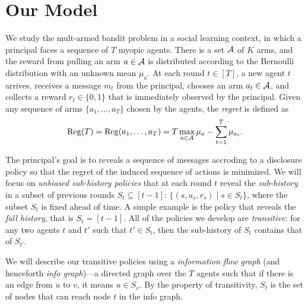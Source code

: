 \section{Our Model}
\label{sec:model}

We study the mult-armed bandit problem in a social learning context,
in which a principal faces a sequence of $T$ myopic agents. There is a
set $\mathcal{A}$ of $K$ arms, and the reward from pulling an arm $a\in \mathcal{A}$ is
distributed according to the Bernoulli distribution with an unknown
mean $\mu_a$.  At
each round $t\in [T]$, a new agent $t$ arrives, receives a message
$m_t$ from the principal, chooses an arm $a_t\in \mathcal{A}$, and collects a
reward $r_t\in \{0,1\}$ that is immediately observed by the
principal. Given any sequence of arms $\{a_1, \ldots, a_T\}$ chosen by
the agents, the \emph{regret} is defined as
\[
  \mathrm{Reg}(T)= \mathrm{Reg}(a_1, \ldots , a_T) = T \max_{a\in \mathcal{A}} \mu_a -
  \sum_{t=1}^T \mu_{a_t}.
\]





 The principal's goal is to reveals
a sequence of messages accroding to a disclosure policy so that the
regret of the induced sequence of actions is minimized. We will focus
on \emph{unbiased sub-history policies} that at each round $t$ reveal
the \emph{sub-history} in a subset of previous rounds
$S_t\subseteq [t-1]$: $\{(s, a_s, r_s)\mid s \in S_t\}$, where the
subset $S_t$ is fixed ahead of time. A simple example is the policy
that reveals the \emph{full history}, that is $S_t = [t-1]$.  All of
the policies we develop are \emph{transitive}: for any two agents $t$
and $t'$ such that $t'\in S_t$, then the sub-history of $S_t$ contains
that of $S_{t'}$.


 We will describe our transitive
policies using a \emph{information flow graph} (and henceforth
\emph{info graph})---a directed graph over the $T$ agents such that if
there is an edge from $u$ to $v$, it means $u\in S_v$. By the property
of transitivity, $S_t$ is the set of nodes that can reach node $t$ in
the info graph.


